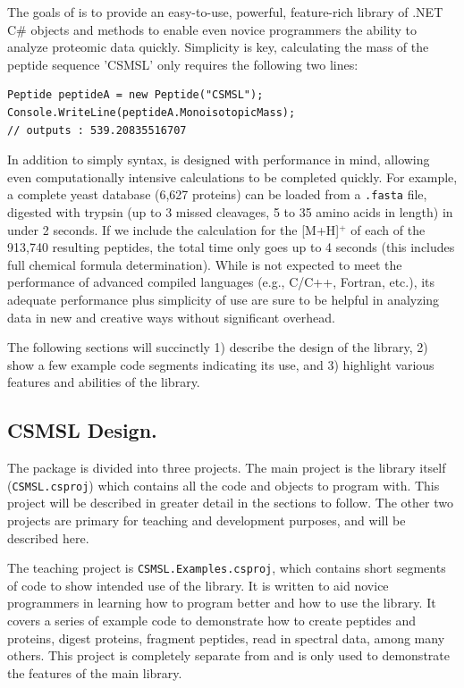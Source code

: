 The goals of \csmsl{} is to provide an easy-to-use, powerful, feature-rich library of .NET C\# objects and methods to enable even novice programmers the ability to analyze proteomic data quickly. Simplicity is key, calculating the mass of the peptide sequence 'CSMSL' only requires the following two lines:
\begin{lstlisting}
Peptide peptideA = new Peptide("CSMSL");
Console.WriteLine(peptideA.MonoisotopicMass);
// outputs : 539.20835516707
\end{lstlisting}
In addition to simply syntax, \csmsl{} is designed with performance in mind, allowing even computationally intensive calculations to be completed quickly. For example, a complete yeast database (6,627 proteins) can be loaded from a \texttt{.fasta} file, digested with trypsin (up to 3 missed cleavages, 5 to 35 amino acids in length) in under 2 seconds. If we include the calculation for the [M+H]$^+$ \mz{} of each of the 913,740 resulting peptides, the total time only goes up to 4 seconds (this includes full chemical formula determination). While \csmsl{} is not expected to meet the performance of advanced compiled languages (e.g., C/C++, Fortran, etc.), its adequate performance plus simplicity of use are sure to be helpful in analyzing data in new and creative ways without significant overhead.

The following sections will succinctly 1) describe the design of the library, 2) show a few example code segments indicating its use, and 3) highlight various features and abilities of the library.

\subsection*{CSMSL Design.}
The \csmsl{} package is divided into three projects. The main project is the library itself (\texttt{CSMSL.csproj}) which contains all the code and objects to program with. This project will be described in greater detail in the sections to follow. The other two projects are primary for teaching and development purposes, and will be described here. 

The teaching project is \texttt{CSMSL.Examples.csproj}, which contains short segments of code to show intended use of the library. It is written to aid novice programmers in learning how to program better and how to use the library. It covers a series of example code to demonstrate how to create peptides and proteins, digest proteins, fragment peptides, read in spectral data, among many others. This project is completely separate from \csmsl{} and is only used to demonstrate the features of the main library. 

